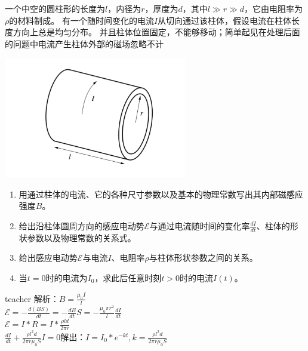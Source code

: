 \begin{example}
一个中空的圆柱形的长度为$l$，内径为$r$，厚度为$d$，其中$l\gg r\gg d$，它由电阻率为$\rho$的材料制成。
有一个随时间变化的电流$I$从切向通过该柱体，假设电流在柱体长度方向上总是均匀分布。
并且柱体位置固定，不能够移动；简单起见在处理后面的问题中电流产生柱体外部的磁场忽略不计

\begin{center}
\includegraphics[width=0.6\textwidth]{images/3-2.pdf} 
\end{center}


\begin{enumerate}
\item 用通过柱体的电流、它的各种尺寸参数以及基本的物理常数写出其内部磁感应强度$B$。
\item 给出沿柱体圆周方向的感应电动势$\mathcal{E}$与通过电流随时间的变化率$\frac{dI}{dt}$、柱体的形状参数以及物理常数的关系式。
\item 给出感应电动势$\mathcal{E}$与电流$I$、电阻率$\rho$与柱体形状参数之间的关系。
\item 当$t=0$时的电流为$I_0$，求此后任意时刻$t>0$时的电流$I(t)$。
\end{enumerate}
\begin{taggedblock}{teacher}
\noindent
解析：$B=\frac{\mu_0 I}{l}$
\\$\mathcal{E}=-\frac{d(BS)}{dt}=-\frac{dB}{dt}S=-\frac{\mu_0\pi r^2}{l}\frac{dI}{dt}$
\\$\mathcal{E}=I*R=I*\frac{\rho ld}{2\pi r}$
\\$\frac{dI}{dt}+\frac{\rho l^2d}{2\pi r\mu_0 S}I=0$解出：$I=I_0*e^{-kt},k=\frac{\rho l^2d}{2\pi r\mu_0 S}$
\end{taggedblock}
\end{example}


